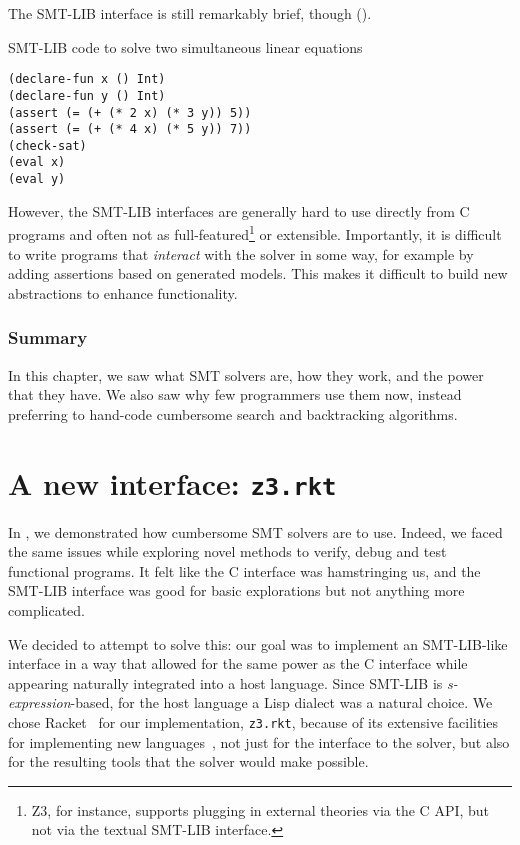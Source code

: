 The SMT-LIB interface is still remarkably brief, though ().

\begin{program}
\caption{SMT-LIB code to solve two simultaneous linear equations}
\label{fig:smtlib-simultaneous}
\begin{verbatim}
(declare-fun x () Int)
(declare-fun y () Int)
(assert (= (+ (* 2 x) (* 3 y)) 5))
(assert (= (+ (* 4 x) (* 5 y)) 7))
(check-sat)
(eval x)
(eval y)
\end{verbatim}
\end{program}

However, the SMT-LIB interfaces are generally hard to use directly from C
programs and often not as full-featured\footnote{Z3, for instance, supports
plugging in external theories via the C API, but not via the textual SMT-LIB
interface.}  or extensible. Importantly, it is difficult to write programs
that \textit{interact} with the solver in some way, for example by adding
assertions based on generated models. This makes it difficult to build new
abstractions to enhance functionality.

\subsection*{Summary}

In this chapter, we saw what SMT solvers are, how they work, and the power
that they have. We also saw why few programmers use them now, instead
preferring to hand-code cumbersome search and backtracking algorithms.

\chapter{A new interface: \texttt{z3.rkt}}

In , we demonstrated how cumbersome SMT solvers are to
use. Indeed, we faced the same issues while exploring novel methods to verify,
debug and test functional programs. It felt like the C interface was
hamstringing us, and the SMT-LIB interface was good for basic explorations but
not anything more complicated.

We decided to attempt to solve this: our goal was to implement an SMT-LIB-like interface
in a way that allowed for the same power as the C interface while appearing
naturally integrated into a host language. Since SMT-LIB is {\em
s-expression}-based, for the host language a Lisp dialect was a natural
choice. We chose Racket~\cite{racket} for our implementation, \texttt{z3.rkt},
because of its extensive facilities for implementing new 
languages~\cite{Tobin-Hochstadt:11}, not just for the interface to the solver,
but also for the resulting tools that the solver would make possible.

